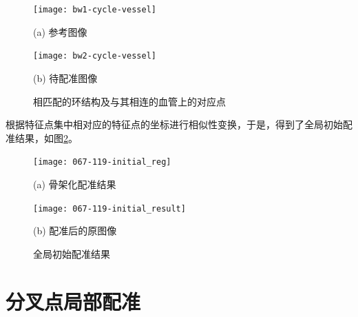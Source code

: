 \begin{figure}
\centering
  \begin{minipage}[b]{0.48\textwidth} 
      \centering 
      \texttt{[image: bw1-cycle-vessel]}
        \centerline{(a) 参考图像}\medskip
    \end{minipage}
  \begin{minipage}[b]{0.48\textwidth}
    \centering
    \texttt{[image: bw2-cycle-vessel]}
      \centerline{(b) 待配准图像}\medskip
  \end{minipage}
\caption{相匹配的环结构及与其相连的血管上的对应点}
\label{fig:global points}
\end{figure}


根据特征点集中相对应的特征点的坐标进行相似性变换，于是，得到了全局初始配准结果，如图\ref{fig:global results}。


\begin{figure}
\centering
  \begin{minipage}[b]{0.48\textwidth} 
      \centering 
      \texttt{[image: 067-119-initial\_reg]}
        \centerline{(a) 骨架化配准结果}\medskip
    \end{minipage}
  \begin{minipage}[b]{0.48\textwidth}
    \centering
    \texttt{[image: 067-119-initial\_result]}
      \centerline{(b) 配准后的原图像}\medskip
  \end{minipage}
\caption{全局初始配准结果}
\label{fig:global results}
\end{figure}


\section{分叉点局部配准}
\label{}

